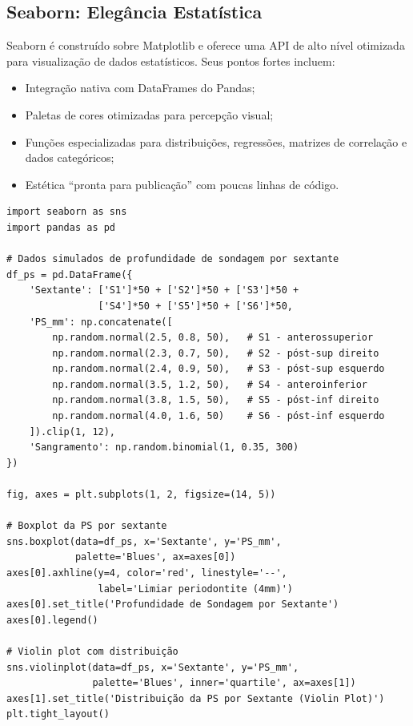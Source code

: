 \subsection{Seaborn: Elegância Estatística}

Seaborn  é construído sobre Matplotlib e oferece uma API de alto nível otimizada para visualização de dados estatísticos. Seus pontos fortes incluem:

\begin{itemize}
    \item Integração nativa com DataFrames do Pandas;
    \item Paletas de cores otimizadas para percepção visual;
    \item Funções especializadas para distribuições, regressões, matrizes de correlação e dados categóricos;
    \item Estética ``pronta para publicação'' com poucas linhas de código.
\end{itemize}

\begin{verbatim}
import seaborn as sns
import pandas as pd

# Dados simulados de profundidade de sondagem por sextante
df_ps = pd.DataFrame({
    'Sextante': ['S1']*50 + ['S2']*50 + ['S3']*50 +
                ['S4']*50 + ['S5']*50 + ['S6']*50,
    'PS_mm': np.concatenate([
        np.random.normal(2.5, 0.8, 50),   # S1 - anterossuperior
        np.random.normal(2.3, 0.7, 50),   # S2 - póst-sup direito
        np.random.normal(2.4, 0.9, 50),   # S3 - póst-sup esquerdo
        np.random.normal(3.5, 1.2, 50),   # S4 - anteroinferior
        np.random.normal(3.8, 1.5, 50),   # S5 - póst-inf direito
        np.random.normal(4.0, 1.6, 50)    # S6 - póst-inf esquerdo
    ]).clip(1, 12),
    'Sangramento': np.random.binomial(1, 0.35, 300)
})

fig, axes = plt.subplots(1, 2, figsize=(14, 5))

# Boxplot da PS por sextante
sns.boxplot(data=df_ps, x='Sextante', y='PS_mm',
            palette='Blues', ax=axes[0])
axes[0].axhline(y=4, color='red', linestyle='--',
                label='Limiar periodontite (4mm)')
axes[0].set_title('Profundidade de Sondagem por Sextante')
axes[0].legend()

# Violin plot com distribuição
sns.violinplot(data=df_ps, x='Sextante', y='PS_mm',
               palette='Blues', inner='quartile', ax=axes[1])
axes[1].set_title('Distribuição da PS por Sextante (Violin Plot)')
plt.tight_layout()
\end{verbatim}

